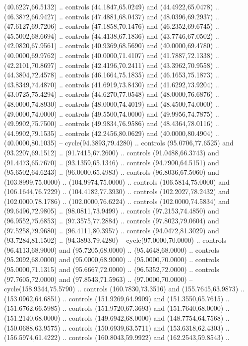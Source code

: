   (40.6227,66.5132) .. controls (44.1847,65.0249) and (44.4922,65.0478) ..
  (46.3872,66.9427) .. controls (47.4881,68.0437) and (48.0396,69.2937) ..
  (47.6127,69.7206) .. controls (47.1858,70.1476) and (46.2352,69.6745) ..
  (45.5002,68.6694) .. controls (44.4138,67.1836) and (43.7746,67.0502) ..
  (42.0820,67.9561) .. controls (40.9369,68.5690) and (40.0000,69.4780) ..
  (40.0000,69.9762) .. controls (40.0000,71.4107) and (41.7887,72.1338) ..
  (42.2101,70.8697) .. controls (42.4196,70.2411) and (43.3962,70.9558) ..
  (44.3804,72.4578) .. controls (46.1664,75.1835) and (46.1653,75.1873) ..
  (43.8349,74.4870) .. controls (41.6919,73.8430) and (41.6292,73.9204) ..
  (43.0725,75.4294) .. controls (44.6270,77.0548) and (48.0000,76.6876) ..
  (48.0000,74.8930) .. controls (48.0000,74.4019) and (48.4500,74.0000) ..
  (49.0000,74.0000) .. controls (49.5500,74.0000) and (49.9956,74.7875) ..
  (49.9902,75.7500) .. controls (49.9834,76.9586) and (48.4364,78.0116) ..
  (44.9902,79.1535) .. controls (42.2456,80.0629) and (40.0000,80.4904) ..
  (40.0000,80.1035) -- cycle(94.3893,79.4280) .. controls (95.0706,77.6525) and
  (93.2207,69.1512) .. (91.7415,67.2600) .. controls (91.0488,66.3743) and
  (91.4473,65.7670) .. (93.1359,65.1346) .. controls (94.7900,64.5151) and
  (95.6502,64.6243) .. (96.0000,65.4983) .. controls (96.8036,67.5060) and
  (103.8999,75.0000) .. (104.9974,75.0000) .. controls (106.5814,75.0000) and
  (106.1644,76.7229) .. (104.4182,77.3930) .. controls (102.2027,78.2432) and
  (102.0000,78.1786) .. (102.0000,76.6224) .. controls (102.0000,74.5834) and
  (99.6496,72.9805) .. (98.0811,73.9499) .. controls (97.2153,74.4850) and
  (96.9552,75.6853) .. (97.3575,77.2884) .. controls (97.8023,79.0604) and
  (97.5258,79.9680) .. (96.4111,80.3957) .. controls (94.0472,81.3029) and
  (93.7284,81.1502) .. (94.3893,79.4280) -- cycle(97.0000,70.0000) .. controls
  (96.4113,68.9000) and (95.7205,68.0000) .. (95.4648,68.0000) .. controls
  (95.2092,68.0000) and (95.0000,68.9000) .. (95.0000,70.0000) .. controls
  (95.0000,71.1315) and (95.6667,72.0000) .. (96.5352,72.0000) .. controls
  (97.7605,72.0000) and (97.8543,71.5963) .. (97.0000,70.0000) --
  cycle(158.9344,75.5790) .. controls (160.7830,73.3516) and (155.7645,63.9873)
  .. (153.0962,64.6851) .. controls (151.9269,64.9909) and (151.3550,65.7615) ..
  (151.6762,66.5985) .. controls (151.9720,67.3693) and (151.7640,68.0000) ..
  (151.2140,68.0000) .. controls (149.6942,68.0000) and (148.7754,64.7568) ..
  (150.0688,63.9575) .. controls (150.6939,63.5711) and (153.6318,62.4303) ..
  (156.5974,61.4222) .. controls (160.8043,59.9922) and (162.2543,59.8543) ..
